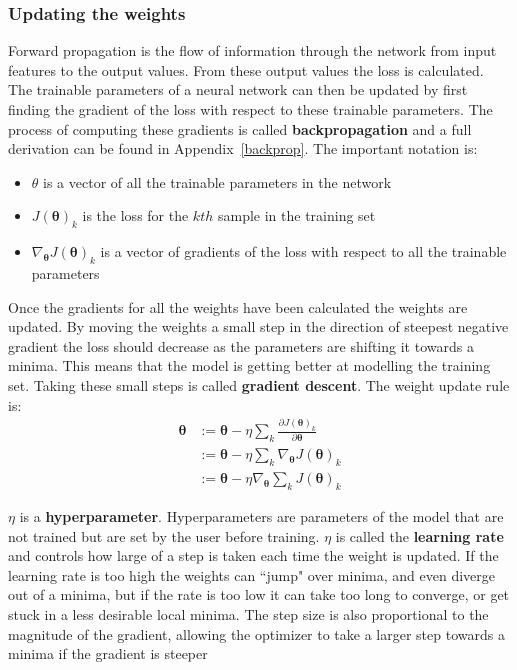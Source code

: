 \documentclass[12pt,a4paper,twoside,openright]{report}
\renewcommand{\vec}[1]{\bm{#1}}
\begin{document}
\subsubsection{Updating the weights}

Forward propagation is the flow of information through the network from input features to the output values. From these output values the loss is calculated. 
The trainable parameters of a neural network can then be updated by first finding the gradient of the loss with respect to these trainable parameters.
The process of computing these gradients is called \textbf{backpropagation} and a full derivation can be found in Appendix~\ref{backprop}. The important notation is:

\begin{itemize}
  \item $\theta$ is a vector of all the trainable parameters in the network
  \item $J(\vec{\theta})_k$ is the loss for the $kth$ sample in the training set
  \item $\nabla_{\vec{\theta}} J(\vec{\theta})_k$ is a vector of gradients of the loss with respect to all the trainable parameters 
\end{itemize}

Once the gradients for all the weights have been calculated the weights are updated. By moving the weights a small step in the direction of steepest 
negative gradient the loss should decrease as the parameters are shifting it towards a minima. This means that the model is getting 
better at modelling the training set. Taking these small steps is called \textbf{gradient descent}. The weight update rule is: 
\begin{align}
  \vec{\theta} & := \mathbf{\vec{\theta}} - \eta \sum_{k} \frac{\partial J(\vec{\theta})_k}{\partial \mathbf{\vec{\theta}}} \\
  & := \mathbf{\vec{\theta}} - \eta \sum_{k} \nabla_{\vec{\theta}} J(\vec{\theta})_k \\
  & := \mathbf{\vec{\theta}} - \eta \nabla_{\vec{\theta}} \sum_{k} J(\vec{\theta})_k \label{eq:weight}
\end{align}

$\eta$ is a \textbf{hyperparameter}. Hyperparameters are parameters of the model that are not trained but are set by the user before training.
$\eta$ is called the \textbf{learning rate} and controls how large of a step is taken each time the weight is updated. If the learning rate is 
too high the weights can ``jump" over minima, and even diverge out of a minima, but if the rate is too low it can take too long to converge,
or get stuck in a less desirable local minima. The step size is also proportional to the magnitude of the gradient, allowing the optimizer to 
take a larger step towards a minima if the gradient is steeper
\end{document}

